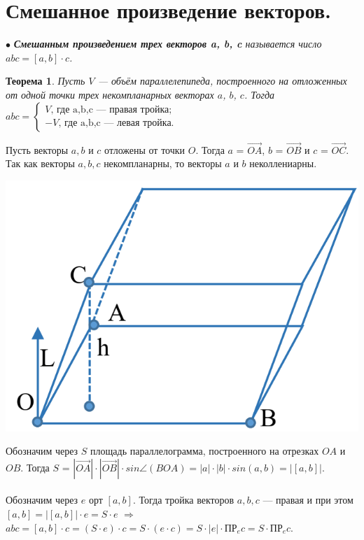 \section{Смешанное произведение векторов.}
$\bullet$ \textit{\textbf{Смешанным произведением трех векторов a, b, c} называется число $abc = [a,b]\cdot c$.}
\newtheorem*{th2_6_1}{Теорема}\begin{th2_6_1}
	Пусть $V$ --- объём параллелепипеда, построенного на отложенных от одной точки трех некомпланарных векторах $a$, $b$, $c$. Тогда $abc = \begin{cases} V\text{, где a,b,c --- правая тройка}; \\  
		-V\text{, где a,b,c  --- левая тройка}. \end{cases}$ \end{th2_6_1}
\begin{Proof}
	Пусть векторы $a,b$ и $c$ отложены от точки $O$. Тогда $a$ = $\overrightarrow{OA}$, $b$ = $\overrightarrow{OB}$ и $c$ = $\overrightarrow{OC}$. Так как векторы $a, b, c$ некомпланарны, то векторы $a$ и $b$ неколлениарны.\\
	\begin{center}
		\includegraphics[scale=0.2]{images/par_2_6.png}
	\end{center}
	Обозначим через $S$ площадь параллелограмма, построенного на отрезках $OA$ и $OB$. Тогда $S$ = $|\overrightarrow{OA}|\cdot|\overrightarrow{OB}|\cdot sin \angle (BOA) = |a| \cdot |b| \cdot sin(a, b) = |[a, b]|$. \\\\
	Обозначим через $e$ орт $[a, b]$. Тогда тройка векторов $a, b, c$ --- правая и при этом \\ $[a, b] = |[a, b]|\cdot e = S \cdot e$ $\Rightarrow$ $abc = [a, b]\cdot c = (S \cdot e) \cdot c = S \cdot (e \cdot c) = S\cdot|e|\cdot\text{ПР}_e c = S\cdot\text{ПР}_e c$. \\\\

\end{Proof}

